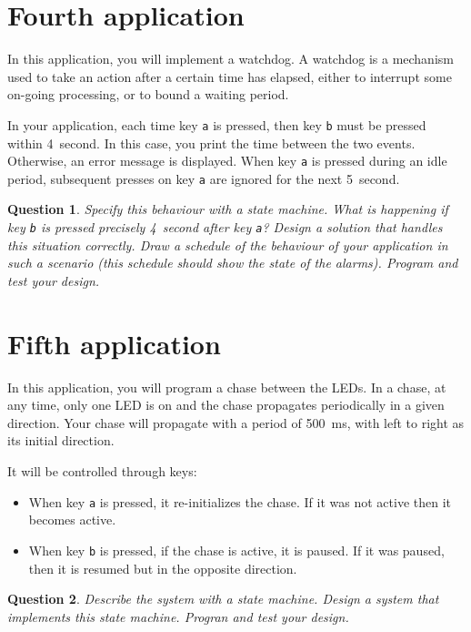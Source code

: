 \documentclass[11pt]{report}
\newtheorem{ex}{Question}
\begin{document}
\section{Fourth application}

In this application, you will implement a watchdog.
A watchdog is a mechanism used to take an action after a certain time has elapsed, either to interrupt some on-going processing, or to bound a waiting period.

In your application, each time key \verb-a- is pressed, then key \verb-b- must be pressed within \SI{4}{second}.
In this case, you print the time between the two events.
Otherwise, an error message is displayed.
When key \verb-a- is pressed during an idle period, subsequent presses on key \verb-a- are ignored for the next \SI{5}{second}.

\begin{ex}
    Specify this behaviour with a state machine.
    What is happening if key \verb-b- is pressed precisely \SI{4}{second} after key \verb-a-?
    Design a solution that handles this situation correctly.
    Draw a schedule of the behaviour of your application in such a scenario (this schedule should show the state of the alarms).
    Program and test your design.
\end{ex}

\section{Fifth application}

In this application, you will program a chase between the LEDs.
In a chase, at any time, only one LED is on and the chase propagates periodically in a given direction.
Your chase will propagate with a period of \SI{500}{\milli\second}, with left to right as its initial direction.

It will be controlled through keys:
\begin{itemize}
  \item
    When key \verb-a- is pressed, it re-initializes the chase.
    If it was not active then it becomes active.
  \item
    When key \verb-b- is pressed, if the chase is active, it is paused.
    If it was paused, then it is resumed but in the opposite direction.
\end{itemize}

\begin{ex}
  Describe the system with a state machine.
  Design a system that implements this state machine.
  Progran and test your design.
\end{ex}
\end{document}
